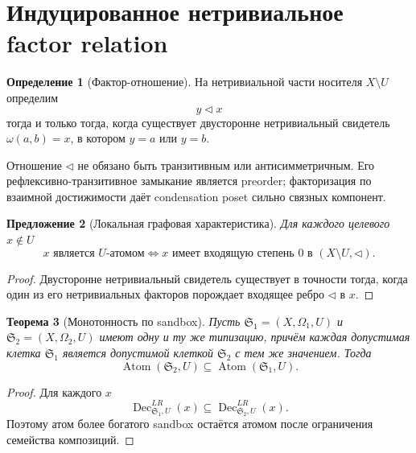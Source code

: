 \documentclass[11pt]{article}
\newtheorem{theorem}{Теорема}[section]
\newtheorem{proposition}[theorem]{Предложение}
\theoremstyle{definition}
\newtheorem{definition}[theorem]{Определение}
\theoremstyle{remark}
\newcommand{\Sbx}{\mathfrak S}
\newcommand{\Atom}{\operatorname{Atom}}
\newcommand{\Dec}{\operatorname{Dec}}
\begin{document}
\section{Индуцированное нетривиальное factor relation}

\begin{definition}[Фактор-отношение]
На нетривиальной части носителя \(X\setminus U\) определим
\begin{equation}
y\triangleleft x
\label{eq:factorrel}
\end{equation}
тогда и только тогда, когда существует двусторонне нетривиальный свидетель \(\omega(a,b)=x\), в котором \(y=a\) или \(y=b\).
\end{definition}

Отношение \(\triangleleft\) не обязано быть транзитивным или антисимметричным. Его рефлексивно-транзитивное замыкание является preorder; факторизация по взаимной достижимости даёт condensation poset сильно связных компонент.

\begin{proposition}[Локальная графовая характеристика]
Для каждого целевого \(x\notin U\)
\begin{equation}
\boxed{x\text{ является }U\text{-атомом}\iff x\text{ имеет входящую степень }0\text{ в }(X\setminus U,\triangleleft).}
\label{eq:indegree}
\end{equation}
\end{proposition}

\begin{proof}
Двусторонне нетривиальный свидетель существует в точности тогда, когда один из его нетривиальных факторов порождает входящее ребро \(\triangleleft\) в \(x\).
\end{proof}

\begin{theorem}[Монотонность по sandbox]
Пусть \(\Sbx_1=(X,\Omega_1,U)\) и \(\Sbx_2=(X,\Omega_2,U)\) имеют одну и ту же типизацию, причём каждая допустимая клетка \(\Sbx_1\) является допустимой клеткой \(\Sbx_2\) с тем же значением. Тогда
\begin{equation}
\boxed{\Atom(\Sbx_2,U)\subseteq\Atom(\Sbx_1,U).}
\label{eq:monotonicity}
\end{equation}
\end{theorem}

\begin{proof}
Для каждого \(x\)
\[
\Dec^{LR}_{\Sbx_1,U}(x)\subseteq\Dec^{LR}_{\Sbx_2,U}(x).
\]
Поэтому атом более богатого sandbox остаётся атомом после ограничения семейства композиций.
\end{proof}
\end{document}
